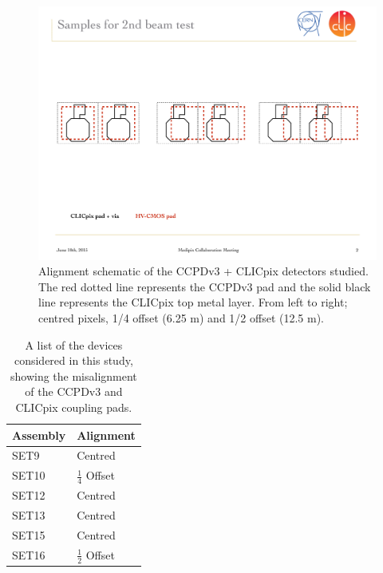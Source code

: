 \begin{figure}[h!]
\centering
\includegraphics[width=1.0\textwidth]{CLICdpVertex/Plots/misalignedPads.pdf}
\caption[Schematic of alignment of CCPDv3 and CLICpix sensors studied in this analysis.]{Alignment schematic of the CCPDv3 + CLICpix detectors studied.  The red dotted line represents the CCPDv3 pad and the solid black line represents the CLICpix top metal layer.  From left to right; centred pixels, 1/4 offset (6.25 {\mu}m) and 1/2 offset (12.5 {\mu}m).}
\label{fig:alignment}
\end{figure}

\begin{table}[h!]
\centering
\begin{tabular}{ l l }
\hline
Assembly & Alignment \\ 
\hline
SET9 & Centred \\
SET10 & $\frac{1}{4}$ Offset \\
SET12 & Centred \\
SET13 & Centred \\
SET15 & Centred \\
SET16 & $\frac{1}{2}$ Offset \\
\hline
\end{tabular}
\caption[A list of the devices considered in this study, showing the misalignment of the CCPDv3 and CLICpix coupling pads.]{A list of the devices considered in this study, showing the misalignment of the CCPDv3 and CLICpix coupling pads.}
\label{table:alignment}
\end{table}


